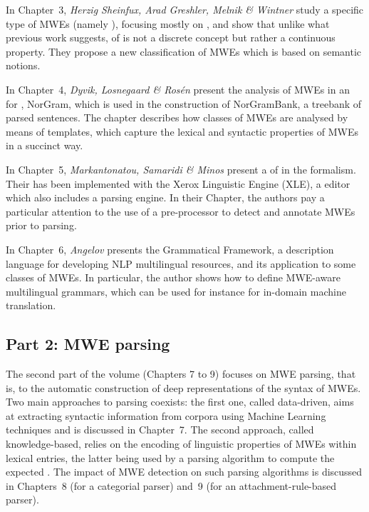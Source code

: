 \documentclass[output=paper]{langsci/langscibook}
\begin{document}
In Chapter~3, \textit{Herzig Sheinfux, Arad Greshler, Melnik \&
  Wintner} study a specific type of MWEs (namely ),
focusing mostly on , and show that unlike what previous work
suggests,  of  is not a discrete concept but
rather a continuous property. They propose a new classification of
MWEs which is based on semantic notions.

In Chapter~4, \textit{Dyvik, Losnegaard \& Rosén} present the analysis
of MWEs in an   for , NorGram, which is used in the
construction of NorGramBank, a treebank of parsed sentences. The
chapter describes how classes of MWEs are analysed by means of 
templates, which capture the lexical and syntactic properties of MWEs
in a succinct way.

In Chapter~5, \textit{Markantonatou, Samaridi \& Minos} present a
 of  in the  formalism. Their  has been
implemented with the Xerox Linguistic Engine (XLE), a  editor
which also includes a parsing engine. In their Chapter, the authors
pay a particular attention to the use of a pre-processor to detect and
annotate MWEs prior to parsing.

In Chapter~6, \textit{Angelov} presents the Grammatical Framework, a
description language for developing NLP multilingual resources, and
its application to some classes of MWEs. In particular, the author
shows how to define MWE-aware multilingual grammars, which can be used
for instance for in-domain machine translation.

\subsection*{Part 2: MWE parsing}

The second part of the volume (Chapters 7 to 9) focuses on MWE
parsing, that is, to the automatic construction of deep
representations of the syntax of MWEs. Two main approaches to parsing
coexists: the first one, called data-driven, aims at extracting
syntactic information from corpora using Machine Learning techniques
and is discussed in Chapter~7. The second approach, called
knowledge-based, relies on the encoding of linguistic properties of
MWEs within lexical entries, the latter being used by a parsing
algorithm to compute the expected . The impact of
MWE detection on such parsing algorithms is discussed in Chapters~8
(for a categorial parser) and~9 (for an attachment-rule-based parser).
\end{document}
